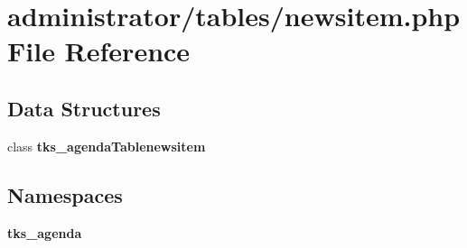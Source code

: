 \section{administrator/tables/newsitem.php File Reference}
\label{administrator_2tables_2newsitem_8php}
\subsection*{Data Structures}
\begin{DoxyCompactItemize}
\item 
class \textbf{ tks\+\_\+agenda\+Tablenewsitem}
\end{DoxyCompactItemize}
\subsection*{Namespaces}
\begin{DoxyCompactItemize}
\item 
 \textbf{ tks\+\_\+agenda}
\end{DoxyCompactItemize}
